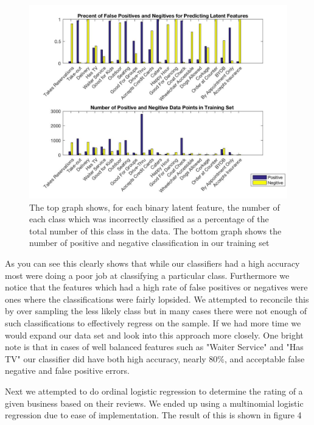 \documentclass{article}
\begin{document}
\begin{figure}[!h]
\includegraphics[scale = .3]{fpPlot}
\caption{The top graph shows, for each binary latent feature, the number of each class which was incorrectly classified as a percentage of the total number of this class in the data. The bottom graph shows the number of positive and negative classification in our training set}
\end{figure}

As you can see this clearly  shows that while our classifiers had a high accuracy most were doing a poor job at classifying a particular class. Furthermore we notice that the features which had a high rate of false positives or negatives were  ones where the  classifications were fairly lopsided. We attempted to  reconcile this by over sampling the less likely class but in many cases there were not enough of such classifications to effectively regress on the sample. If we had more time we would expand our data set and look into this approach more closely. One bright note is that in cases of well balanced features such as "Waiter Service" and "Has TV"  our classifier did have both high accuracy, nearly 80\%, and acceptable false negative and false positive errors.

Next we attempted to do ordinal logistic regression to determine the rating of a given business based on their reviews. We ended up using a multinomial logistic regression due to ease of implementation.  The result of this is shown in figure 4 
\end{document}
